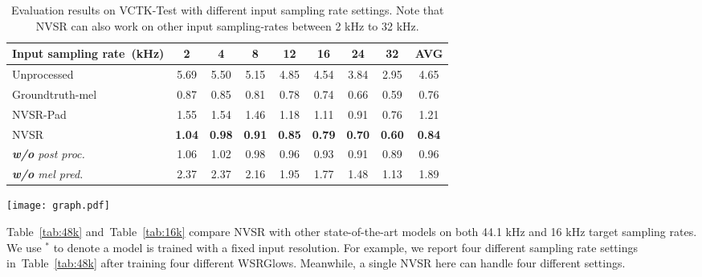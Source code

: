 \documentclass[a4paper]{article}
\def\Tabref#1{Table~\ref{#1}}
\begin{document}
\begin{table*}[htbp]
\begin{minipage}{0.65\textwidth}
\caption{Evaluation results on VCTK-Test with different input sampling rate settings. Note that NVSR can also work on other input sampling-rates between 2 kHz to 32 kHz.}
\label{table:main_result}
\begin{tabular}{@{}lcccccccc@{}}
\toprule
Input sampling rate~(kHz)                & 2 & 4 & 8 & 12 & 16 & 24 & 32 & AVG  \\ \midrule
Unprocessed          & 5.69 & 5.50 & 5.15 & 4.85  & 4.54  & 3.84  & 2.95  & 4.65 \\
Groundtruth-mel & 0.87 & 0.85 & 0.81 & 0.78  & 0.74  & 0.66  & 0.59  & 0.76 \\ \midrule
NVSR-Pad        & 1.55 & 1.54 & 1.46 & 1.18  & 1.11  & 0.91  & 0.76  & 1.21 \\
NVSR & \textbf{1.04} & \textbf{0.98} & \textbf{0.91} & \textbf{0.85}  & \textbf{0.79}  & \textbf{0.70}  & \textbf{0.60}  & \textbf{0.84} \\
\textit{\textbf{w/o} post proc.}       & 1.06 & 1.02 & 0.98 & 0.96  & 0.93  & 0.91  & 0.89  & 0.96 \\
\textit{\textbf{w/o} mel pred.}   & 2.37 & 2.37 & 2.16 & 1.95  & 1.77  & 1.48  & 1.13  & 1.89 \\ \bottomrule
\end{tabular}
\end{minipage}\hfill
\begin{minipage}{0.30\textwidth}
\texttt{[image: graph.pdf]}
\label{fig-visualization_of_table}
\end{minipage}
\vspace{-1em}
\end{table*}

\Tabref{tab:48k} and~\Tabref{tab:16k} compare NVSR with other state-of-the-art models on both 44.1 kHz and 16 kHz target sampling rates. We use $^{*}$ to denote a model is trained with a fixed input resolution. For example, we report four different sampling rate settings in~\Tabref{tab:48k} after training four different WSRGlows. Meanwhile, a single NVSR here can handle four different settings.
\end{document}
